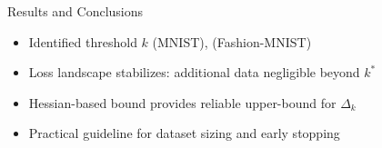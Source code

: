 \documentclass{beamer}
\begin{document}

\begin{frame}{Results and Conclusions}
    \begin{itemize}
        \item Identified threshold $k$ (MNIST), (Fashion-MNIST)
        \item Loss landscape stabilizes: additional data negligible beyond $k^*$
        \item Hessian-based bound provides reliable upper-bound for $\Delta_k$
        \item Practical guideline for dataset sizing and early stopping
    \end{itemize}
\end{frame}
\end{document}
